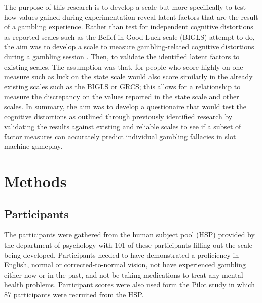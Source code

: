 \documentclass[twoside,twocolumn]{article}
\begin{document}
The purpose of this research is to develop a scale but more specifically to test how values gained during experimentation reveal latent factors that are the result of a gambling experience. Rather than test for independent cognitive distortions as reported scales such as the Belief in Good Luck scale (BIGLS) attempt to do, the aim was to develop a scale to measure gambling-related cognitive distortions during a gambling session \cite{darke:1997, Leonard:2015}. Then, to validate the identified latent factors to existing scales. The assumption was that, for people who score highly on one measure such as luck on the state scale would also score similarly in the already existing scales such as the BIGLS or GRCS; this allows for a relationship to measure the discrepancy on the values reported in the state scale and other scales. In summary, the aim was to develop a questionaire that would test the cognitive distortions as outlined through previously identified research by validating the results against existing and reliable scales to see if a subset of factor measures can accurately predict individual gambling fallacies in slot machine gameplay. \cite{Leonard:2015}


\section{Methods}

\subsection{Participants}
The participants were gathered from the human subject pool (HSP) provided by the department of psychology with 101  of these participants filling out the scale being developed. Participants needed to have demonstrated a proficiency in English, normal or corrected-to-normal vision, not have experienced gambling either now or in the past, and not be taking medications to treat any mental health problems. Participant scores were also used form the Pilot study in which 87 participants were recruited from the HSP.
\end{document}
